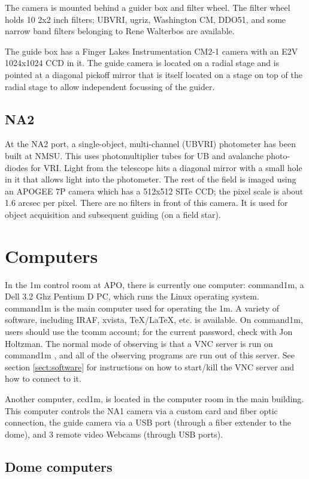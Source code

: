 \documentclass[10pt]{report}
\begin{document}
The camera is mounted behind a guider box and filter wheel. The filter wheel
holds 10 2x2 inch filters; UBVRI, ugriz, Washington CM, DDO51, and some 
narrow band filters belonging to Rene Walterbos are available.

The guide box has a Finger Lakes Instrumentation CM2-1 camera with an E2V
1024x1024 CCD in it. The guide camera is located on a radial stage and is
pointed at a diagonal pickoff mirror that is itself located on a stage on
top of the radial stage to allow independent focussing of the guider.

\subsection{NA2}

At the NA2 port, a single-object, multi-channel (UBVRI) photometer has been 
built at NMSU.  This uses photomultiplier tubes for UB and avalanche photo-diodes
for VRI. Light from the telescope hits a diagonal mirror with a small hole
in it that allows light into the photometer. The rest of the field is imaged
using an APOGEE 7P camera which has a 512x512 SITe CCD; the pixel scale is
about 1.6 arcsec per pixel. There are no filters in front of this camera.
It is used for object acquisition and subsequent guiding (on a field star).

\section{Computers}

In the 1m control room at APO, there is currently one computer:
command1m, a Dell 3.2 Ghz Pentium D PC, which runs the Linux operating
system.  command1m is the main computer used for operating the 1m.
A variety of software, including IRAF, xvista, TeX/LaTeX, etc. is
available.  On command1m, users should use the tcomm account; for
the current password, check with Jon Holtzman.  The normal mode of
observing is that a VNC server is run on command1m , and all of the
observing programs are run out of this server. See section
\ref{sect:software} for instructions on how to start/kill the VNC
server and how to connect to it.

Another computer, ccd1m, is located in the computer room in the main
building. This computer controls the NA1 camera via a custom card and fiber
optic connection, the guide camera via a USB port (through a fiber extender
to the dome), and 3 remote video Webcams (through USB ports).

\subsection{Dome computers}
\end{document}

